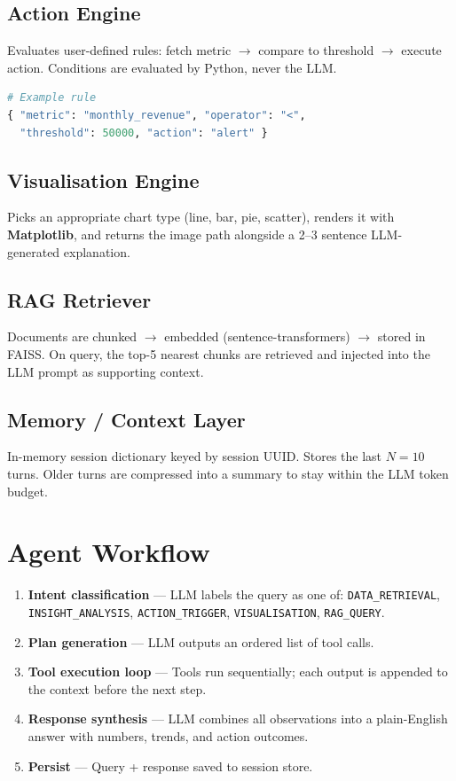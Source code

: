 \documentclass[11pt,a4paper]{article}
\begin{document}
\subsection{Action Engine}
Evaluates user-defined rules: fetch metric $\to$ compare to threshold $\to$ execute action. Conditions are evaluated by Python, never the LLM.

\begin{lstlisting}[language=Python]
# Example rule
{ "metric": "monthly_revenue", "operator": "<",
  "threshold": 50000, "action": "alert" }
\end{lstlisting}

\subsection{Visualisation Engine}
Picks an appropriate chart type (line, bar, pie, scatter), renders it with \textbf{Matplotlib}, and returns the image path alongside a 2--3 sentence LLM-generated explanation.

\subsection{RAG Retriever}
Documents are chunked $\to$ embedded (sentence-transformers) $\to$ stored in FAISS. On query, the top-5 nearest chunks are retrieved and injected into the LLM prompt as supporting context.

\subsection{Memory / Context Layer}
In-memory session dictionary keyed by session UUID. Stores the last $N=10$ turns. Older turns are compressed into a summary to stay within the LLM token budget.

\section{Agent Workflow}

\begin{enumerate}
  \item \textbf{Intent classification} --- LLM labels the query as one of: \texttt{DATA\_RETRIEVAL}, \texttt{INSIGHT\_ANALYSIS}, \texttt{ACTION\_TRIGGER}, \texttt{VISUALISATION}, \texttt{RAG\_QUERY}.
  \item \textbf{Plan generation} --- LLM outputs an ordered list of tool calls.
  \item \textbf{Tool execution loop} --- Tools run sequentially; each output is appended to the context before the next step.
  \item \textbf{Response synthesis} --- LLM combines all observations into a plain-English answer with numbers, trends, and action outcomes.
  \item \textbf{Persist} --- Query + response saved to session store.
\end{enumerate}
\end{document}
